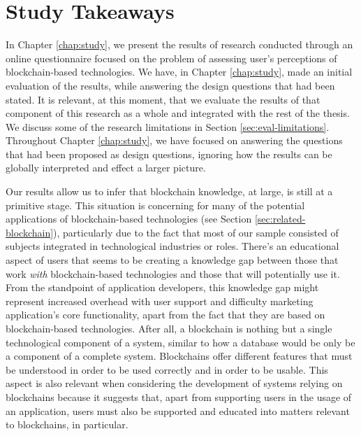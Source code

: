 \section{Study Takeaways}
\label{sec:eval-study}

In Chapter \ref{chap:study}, we present the results of research conducted through an online questionnaire focused on the problem of assessing user's perceptions of blockchain-based technologies. We have, in Chapter \ref{chap:study}, made an initial evaluation of the results, while answering the design questions that had been stated. It is relevant, at this moment, that we evaluate the results of that component of this research as a whole and integrated with the rest of the thesis. We discuss some of the research limitations in Section \ref{sec:eval-limitations}. Throughout Chapter \ref{chap:study}, we have focused on answering the questions that had been proposed as design questions, ignoring how the results can be globally interpreted and effect a larger picture.

Our results allow us to infer that blockchain knowledge, at large, is still at a primitive stage. This situation is concerning for many of the potential applications of blockchain-based technologies (see Section \ref{sec:related-blockchain}), particularly due to the fact that most of our sample consisted of subjects integrated in technological industries or roles. There's an educational aspect of users that seems to be creating a knowledge gap between those that work \emph{with} blockchain-based technologies and those that will potentially use it. From the standpoint of application developers, this knowledge gap might represent increased overhead with user support and difficulty marketing application's core functionality, apart from the fact that they are based on blockchain-based technologies. After all, a blockchain is nothing but a single technological component of a system, similar to how a database would be only be a component of a complete system. Blockchains offer different features that must be understood in order to be used correctly and in order to be usable. This aspect is also relevant when considering the development of systems relying on blockchains because it suggests that, apart from supporting users in the usage of an application, users must also be supported and educated into matters relevant to blockchains, in particular.

